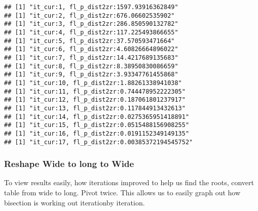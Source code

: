\documentclass[]{article}
\begin{document}
\begin{verbatim}
## [1] "it_cur:1, fl_p_dist2zr:1597.93916362849"
## [1] "it_cur:2, fl_p_dist2zr:676.06602535902"
## [1] "it_cur:3, fl_p_dist2zr:286.850590132782"
## [1] "it_cur:4, fl_p_dist2zr:117.225493866655"
## [1] "it_cur:5, fl_p_dist2zr:37.570593471664"
## [1] "it_cur:6, fl_p_dist2zr:4.60826664896022"
## [1] "it_cur:7, fl_p_dist2zr:14.4217689135683"
## [1] "it_cur:8, fl_p_dist2zr:8.38950830086659"
## [1] "it_cur:9, fl_p_dist2zr:3.93347761455868"
## [1] "it_cur:10, fl_p_dist2zr:1.88261338941038"
## [1] "it_cur:11, fl_p_dist2zr:0.744478952222305"
## [1] "it_cur:12, fl_p_dist2zr:0.187061801237917"
## [1] "it_cur:13, fl_p_dist2zr:0.117844913432613"
## [1] "it_cur:14, fl_p_dist2zr:0.0275365951418891"
## [1] "it_cur:15, fl_p_dist2zr:0.0515488156908255"
## [1] "it_cur:16, fl_p_dist2zr:0.0191152349149135"
## [1] "it_cur:17, fl_p_dist2zr:0.00385372194545752"
\end{verbatim}

\hypertarget{reshape-wide-to-long-to-wide}{%
\subsubsection{Reshape Wide to long to
Wide}\label{reshape-wide-to-long-to-wide}}

To view results easily, how iterations improved to help us find the
roots, convert table from wide to long. Pivot twice. This allows us to
easily graph out how bisection is working out iterationby iteration.
\end{document}
